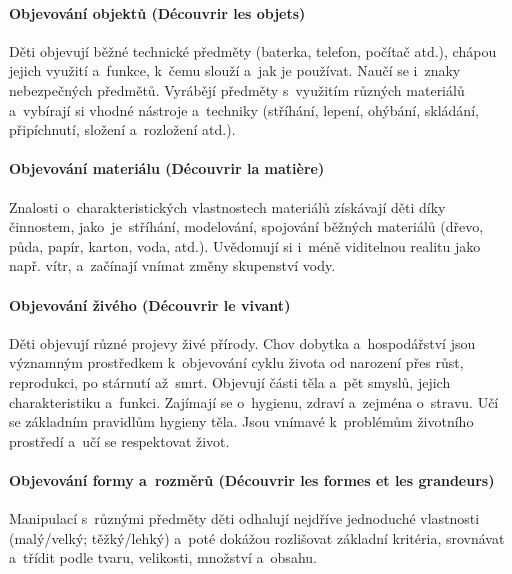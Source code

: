 			\paragraph{Objevování objektů (Découvrir les objets)}
				Děti objevují běžné technické předměty (baterka, telefon, počítač atd.), chápou jejich využití a~funkce, k čemu slouží a~jak je používat. Naučí se i~znaky nebezpečných předmětů.
				Vyrábějí předměty s~využitím různých materiálů a~vybírají si vhodné nástroje a~techniky (stříhání, lepení, ohýbání, skládání, připíchnutí, složení a~rozložení atd.).
			\paragraph{Objevování materiálu (Découvrir la matière)}
				Znalosti o~charakteristických vlastnostech materiálů získávají děti díky činnostem, jako je stříhání, modelování, spojování běžných materiálů (dřevo, půda, papír, karton, voda, atd.).
				Uvědomují si i~méně viditelnou realitu jako např. vítr, a~začínají vnímat změny skupenství vody. 
			\paragraph{Objevování živého (Découvrir le vivant)} 
				Děti objevují různé projevy živé přírody. Chov dobytka a~hospodářství jsou významným prostředkem k objevování cyklu života od narození přes růst, reprodukci, po stárnutí až smrt.
				Objevují části těla a~pět smyslů, jejich charakteristiku a~funkci. Zajímají se o~hygienu, zdraví a~zejména o~stravu. Učí se základním pravidlům hygieny těla. 
				Jsou vnímavé k problémům životního prostředí a~učí se respektovat život. 
			\paragraph{Objevování formy a~rozměrů (Découvrir les formes et les grandeurs)}
				Manipulací s různými předměty děti odhalují nejdříve jednoduché vlastnosti (malý/velký; těžký/lehký) a~poté dokážou rozlišovat základní kritéria, srovnávat a~třídit podle tvaru, velikosti, množství a~obsahu.

